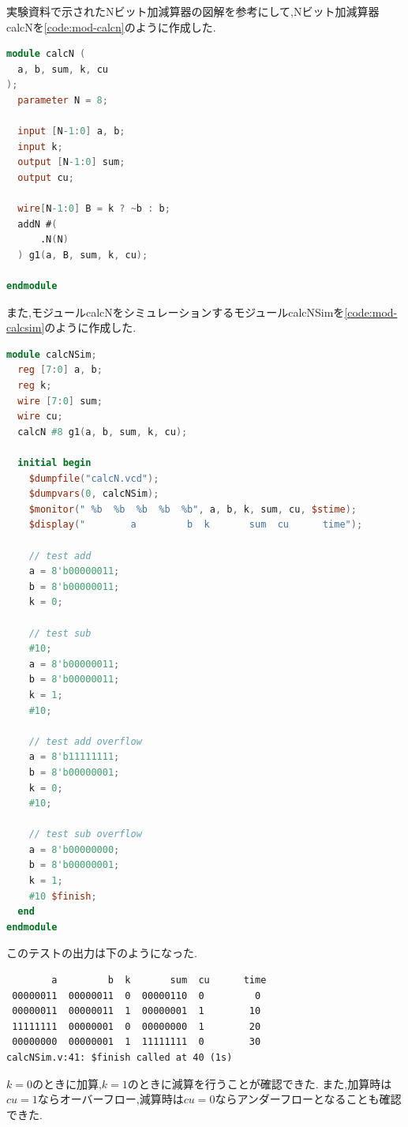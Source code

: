 \documentclass[autodetect-engine, dvi=dvipdfmx, 10pt, a4paper, ja=standard]{bxjsarticle}
\begin{document}
実験資料で示されたNビット加減算器の図解を参考にして,Nビット加減算器calcNを\ref{code:mod-calcn}のように作成した.

\begin{lstlisting}[language={Verilog}, caption={モジュールcalcNのVerilogコード}, label={code:mod-calcn}]
module calcN (
  a, b, sum, k, cu
);
  parameter N = 8;

  input [N-1:0] a, b;
  input k;
  output [N-1:0] sum;
  output cu;

  wire[N-1:0] B = k ? ~b : b;
  addN #(
      .N(N)
  ) g1(a, B, sum, k, cu);

endmodule
\end{lstlisting}

また,モジュールcalcNをシミュレーションするモジュールcalcNSimを\ref{code:mod-calcsim}のように作成した.

\begin{lstlisting}[language={Verilog}, caption={モジュールcalcNSimのVerilogコード}, label={code:mod-calcsim}]
  module calcNSim;
  reg [7:0] a, b;
  reg k;
  wire [7:0] sum;
  wire cu;
  calcN #8 g1(a, b, sum, k, cu);

  initial begin
    $dumpfile("calcN.vcd");
    $dumpvars(0, calcNSim);
    $monitor(" %b  %b  %b  %b  %b", a, b, k, sum, cu, $stime);
    $display("        a         b  k       sum  cu      time");

    // test add
    a = 8'b00000011;
    b = 8'b00000011;
    k = 0;

    // test sub
    #10;
    a = 8'b00000011;
    b = 8'b00000011;
    k = 1;
    #10;

    // test add overflow
    a = 8'b11111111;
    b = 8'b00000001;
    k = 0;
    #10;

    // test sub overflow
    a = 8'b00000000;
    b = 8'b00000001;
    k = 1;
    #10 $finish;
  end
endmodule
\end{lstlisting}

このテストの出力は下のようになった.

\begin{verbatim}
        a         b  k       sum  cu      time
 00000011  00000011  0  00000110  0         0
 00000011  00000011  1  00000001  1        10
 11111111  00000001  0  00000000  1        20
 00000000  00000001  1  11111111  0        30
calcNSim.v:41: $finish called at 40 (1s)
\end{verbatim}

$k = 0$のときに加算,$k = 1$のときに減算を行うことが確認できた.
また,加算時は$cu=1$ならオーバーフロー,減算時は$cu=0$ならアンダーフローとなることも確認できた.
\end{document}
